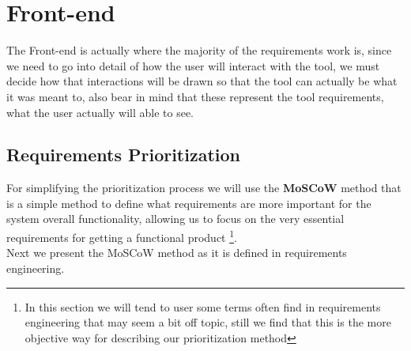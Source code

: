 
\section{Front-end}

The Front-end is actually where the majority of the requirements work is, since we need to go into detail of how the user will interact with the tool, we must decide how that interactions will be drawn so that the tool can actually be what it was meant to, also bear in mind that these represent the tool requirements, what the user actually will able to see.

\subsection{Requirements Prioritization}
For simplifying the prioritization process we will use the \textbf{MoSCoW} method that is a simple method to define what requirements are more important for the system overall functionality, allowing us to focus on the very essential requirements for getting a functional product \footnote{In this section we will tend to user some terms often find in requirements engineering that may seem a bit off topic, still we find that this is the more objective way for describing our prioritization method}.\\
\indent Next we present the MoSCoW method as it is defined in requirements engineering.

